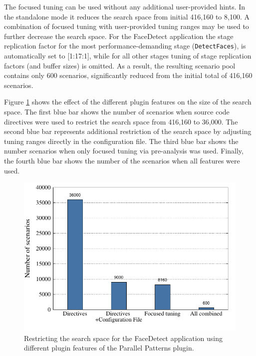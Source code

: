 The focused tuning can be used without any additional user-provided hints. In the standalone mode it reduces the search space from initial 416,160 to 8,100. A combination of focused tuning with user-provided tuning ranges may be used to further decrease the search space. 
For the FaceDetect application the stage replication factor for the most performance-demanding stage (\texttt{DetectFaces}), is automatically set to [1:17:1], while for all other stages tuning of stage replication factors (and buffer sizes) is omitted.
As a result, the resulting scenario pool contains only 600 scenarios, significantly reduced from the initial total of 416,160 scenarios.  


Figure \ref{fig:bpg_comp} shows the effect of the different plugin features on the size of the search space. The first blue bar shows the number of scenarios when source code directives were used to restrict the search space from 416,160 to 36,000. The second blue bar represents additional restriction of the search space by adjusting tuning ranges directly in the configuration file. The third blue bar shows the number scenarios when only focused tuning via pre-analysis was used. Finally, the fourth blue bar shows the number of the scenarios when all features were used. 

\begin{figure}[h]
\centering
\includegraphics[width=14cm]{../BPG/phia-bpg.pdf}
\caption{Restricting the search space for the FaceDetect application using different plugin features of the Parallel Patterns plugin. }
\label{fig:bpg_comp}
\end{figure}

